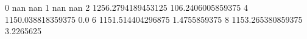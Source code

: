 0 nan nan
1 nan nan
2 1256.2794189453125 106.2406005859375
4 1150.038818359375 0.0
6 1151.514404296875 1.4755859375
8 1153.265380859375 3.2265625
